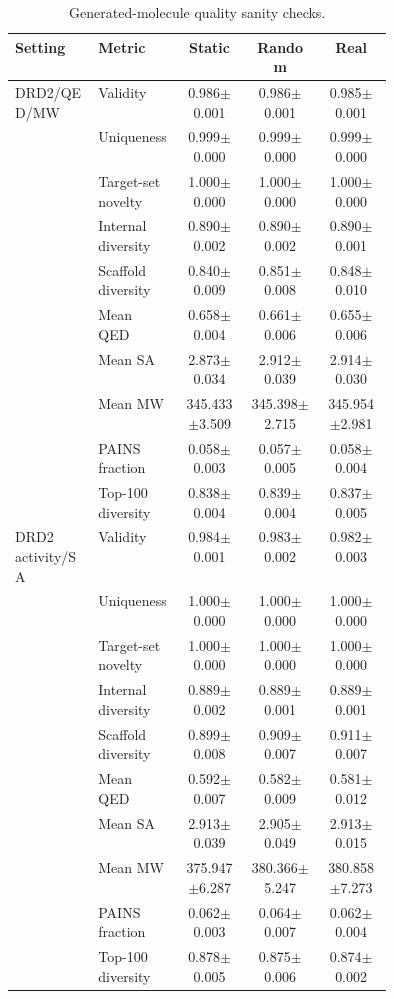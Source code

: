 \begin{table}[!t]
\caption{Generated-molecule quality sanity checks.}
\label{tab:molecule_quality}
\centering
\footnotesize
\setlength{\tabcolsep}{3pt}
\begin{tabularx}{\linewidth}{@{}p{0.22\linewidth}p{0.22\linewidth}ccc@{}}
\toprule
Setting & Metric & Static & Random & Real\\
\midrule
DRD2/QED/MW & Validity & 0.986$\pm$0.001 & 0.986$\pm$0.001 & 0.985$\pm$0.001\\
 & Uniqueness & 0.999$\pm$0.000 & 0.999$\pm$0.000 & 0.999$\pm$0.000\\
 & Target-set novelty & 1.000$\pm$0.000 & 1.000$\pm$0.000 & 1.000$\pm$0.000\\
 & Internal diversity & 0.890$\pm$0.002 & 0.890$\pm$0.002 & 0.890$\pm$0.001\\
 & Scaffold diversity & 0.840$\pm$0.009 & 0.851$\pm$0.008 & 0.848$\pm$0.010\\
 & Mean QED & 0.658$\pm$0.004 & 0.661$\pm$0.006 & 0.655$\pm$0.006\\
 & Mean SA & 2.873$\pm$0.034 & 2.912$\pm$0.039 & 2.914$\pm$0.030\\
 & Mean MW & 345.433$\pm$3.509 & 345.398$\pm$2.715 & 345.954$\pm$2.981\\
 & PAINS fraction & 0.058$\pm$0.003 & 0.057$\pm$0.005 & 0.058$\pm$0.004\\
 & Top-100 diversity & 0.838$\pm$0.004 & 0.839$\pm$0.004 & 0.837$\pm$0.005\\
\addlinespace
DRD2 activity/SA & Validity & 0.984$\pm$0.001 & 0.983$\pm$0.002 & 0.982$\pm$0.003\\
 & Uniqueness & 1.000$\pm$0.000 & 1.000$\pm$0.000 & 1.000$\pm$0.000\\
 & Target-set novelty & 1.000$\pm$0.000 & 1.000$\pm$0.000 & 1.000$\pm$0.000\\
 & Internal diversity & 0.889$\pm$0.002 & 0.889$\pm$0.001 & 0.889$\pm$0.001\\
 & Scaffold diversity & 0.899$\pm$0.008 & 0.909$\pm$0.007 & 0.911$\pm$0.007\\
 & Mean QED & 0.592$\pm$0.007 & 0.582$\pm$0.009 & 0.581$\pm$0.012\\
 & Mean SA & 2.913$\pm$0.039 & 2.905$\pm$0.049 & 2.913$\pm$0.015\\
 & Mean MW & 375.947$\pm$6.287 & 380.366$\pm$5.247 & 380.858$\pm$7.273\\
 & PAINS fraction & 0.062$\pm$0.003 & 0.064$\pm$0.007 & 0.062$\pm$0.004\\
 & Top-100 diversity & 0.878$\pm$0.005 & 0.875$\pm$0.006 & 0.874$\pm$0.002\\

\end{tabularx}
\end{table}

